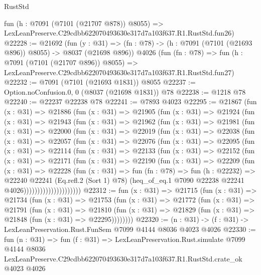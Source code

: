 \begin{lexlean}{RustStd}
\begin{coremodule}
    fun (h : @7091 (@7101 (@21707 @878)) @8055) =>
    LexLeanPreserve.C29cdbb622070493630e317d7a103f637.R1.RustStd.fun26)
@22228 := @21692
    (fun (y : @31) => (fn : @78) -> (h : @7091 (@7101 (@21693 @896)) @8055) -> @8037 (@21698 @896))
    @4026
    (fun (fn : @78) =>
    fun (h : @7091 (@7101 (@21707 @896)) @8055) =>
    LexLeanPreserve.C29cdbb622070493630e317d7a103f637.R1.RustStd.fun27)
@22232 := @7091 (@7101 (@21693 @1831)) @8055
@22237 := Option.noConfusion.{0, 0} (@8037 (@21698 @1831)) @78
@22238 := @1218 @78
@22240 := @22237 @22238 @78
@22241 := @7893 @4023
@22295 := @21867
    (fun (x : @31) =>
    @21886
      (fun (x : @31) =>
      @21905
        (fun (x : @31) =>
        @21924
          (fun (x : @31) =>
          @21943
            (fun (x : @31) =>
            @21962
              (fun (x : @31) =>
              @21981
                (fun (x : @31) =>
                @22000
                  (fun (x : @31) =>
                  @22019
                    (fun (x : @31) =>
                    @22038
                      (fun (x : @31) =>
                      @22057
                        (fun (x : @31) =>
                        @22076
                          (fun (x : @31) =>
                          @22095
                            (fun (x : @31) =>
                            @22114
                              (fun (x : @31) =>
                              @22133
                                (fun (x : @31) =>
                                @22152
                                  (fun (x : @31) =>
                                  @22171
                                    (fun (x : @31) =>
                                    @22190
                                      (fun (x : @31) =>
                                      @22209
                                        (fun (x : @31) =>
                                        @22228
                                          (fun (x : @31) =>
                                          fun (fn : @78) =>
                                          fun (h : @22232) =>
                                          @22240
                                            @22241
                                            (Eq.refl.{2} (Sort 1) @78)
                                            (heq_of_eq.{1}
                                              @7090
                                              @22238
                                              @22241
                                              @4026)))))))))))))))))))))
@22312 := fun (x : @31) =>
  @21715
    (fun (x : @31) =>
    @21734
      (fun (x : @31) =>
      @21753
        (fun (x : @31) =>
        @21772
          (fun (x : @31) =>
          @21791
            (fun (x : @31) =>
            @21810
              (fun (x : @31) => @21829 (fun (x : @31) => @21848 (fun (x : @31) => @22295))))))))
@22320 := (n : @31) -> (f : @31) -> LexLeanPreservation.Rust.FunSem @7099 @4144 @8036 @4023 @4026
@22330 := fun (n : @31) =>
  fun (f : @31) =>
  LexLeanPreservation.Rust.simulate
    @7099
    @4144
    @8036
    LexLeanPreserve.C29cdbb622070493630e317d7a103f637.R1.RustStd.crate_ok
    @4023
    @4026
\end{coremodule}
\end{lexlean}
